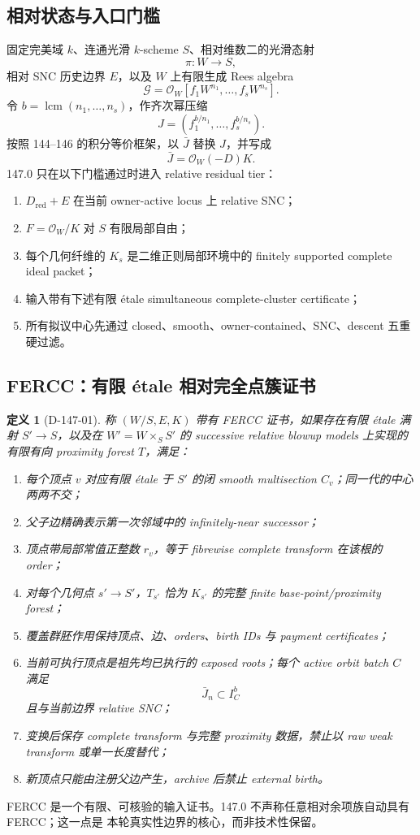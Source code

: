 \documentclass[11pt,a4paper,fontset=fandol]{ctexart}
\newtheorem{definition}[theorem]{定义}
\newcommand{\cO}{\mathcal O}
\newcommand{\G}{\mathcal G}
\begin{document}
\subsection{相对状态与入口门槛}
固定完美域 $k$、连通光滑 $k$-scheme $S$、相对维数二的光滑态射
\[
\pi:W\longrightarrow S,
\]
相对 SNC 历史边界 $E$，以及 $W$ 上有限生成 Rees algebra
\[
\G=\cO_W[f_1W^{n_1},\ldots,f_sW^{n_s}].
\]
令 $b=\operatorname{lcm}(n_1,\ldots,n_s)$，作齐次幂压缩
\[
J=(f_1^{b/n_1},\ldots,f_s^{b/n_s}).
\]
按照 144--146 的积分等价框架，以 $\bar J$ 替换 $J$，并写成
\[
\boxed{\bar J=\cO_W(-D)K.}
\]
147.0 只在以下门槛通过时进入 relative residual tier：
\begin{enumerate}
\item $D_{\mathrm{red}}+E$ 在当前 owner-active locus 上 relative SNC；
\item $F=\cO_W/K$ 对 $S$ 有限局部自由；
\item 每个几何纤维的 $K_s$ 是二维正则局部环境中的 finitely supported complete ideal packet；
\item 输入带有下述有限 étale simultaneous complete-cluster certificate；
\item 所有拟议中心先通过 closed、smooth、owner-contained、SNC、descent 五重硬过滤。
\end{enumerate}

\subsection{FERCC：有限 étale 相对完全点簇证书}
\begin{definition}[D-147-01]
称 $(W/S,E,K)$ 带有 \emph{FERCC} 证书，如果存在有限 étale 满射 $S'\to S$，以及在
$W'=W\times_SS'$ 的 successive relative blowup models 上实现的有限有向 proximity forest
$T$，满足：
\begin{enumerate}
\item 每个顶点 $v$ 对应有限 étale 于 $S'$ 的闭 smooth multisection $C_v$；同一代的中心两两不交；
\item 父子边精确表示第一次邻域中的 infinitely-near successor；
\item 顶点带局部常值正整数 $r_v$，等于 fibrewise complete transform 在该根的 order；
\item 对每个几何点 $s'\to S'$，$T_{s'}$ 恰为 $K_{s'}$ 的完整 finite base-point/proximity forest；
\item 覆盖群胚作用保持顶点、边、orders、birth IDs 与 payment certificates；
\item 当前可执行顶点是祖先均已执行的 exposed roots；每个 active orbit batch $C$ 满足
\[
\bar J_n\subset I_C^b
\]
且与当前边界 relative SNC；
\item 变换后保存 complete transform 与完整 proximity 数据，禁止以 raw weak transform 或单一长度替代；
\item 新顶点只能由注册父边产生，archive 后禁止 external birth。
\end{enumerate}
\end{definition}
FERCC 是一个有限、可核验的输入证书。147.0 不声称任意相对余项族自动具有 FERCC；这一点是
本轮真实性边界的核心，而非技术性保留。
\end{document}
